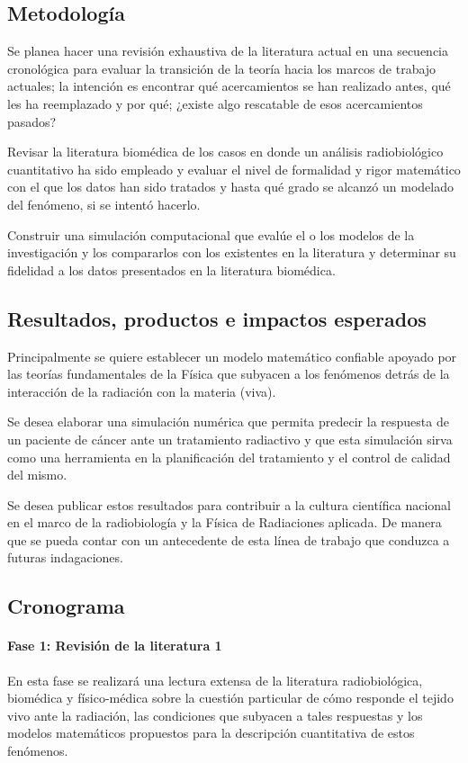 \documentclass[12pt,letterpaper]{article}
\begin{document}
			\subsection*{Metodología}
			Se planea hacer una revisión exhaustiva de la literatura actual en una secuencia cronológica para evaluar la transición de la teoría hacia los marcos de trabajo actuales; la intención es encontrar qué acercamientos se han realizado antes, qué les ha reemplazado y por qué; ¿existe algo rescatable de esos acercamientos pasados?
			
			Revisar la literatura biomédica de los casos en donde un análisis radiobiológico cuantitativo ha sido empleado y evaluar el nivel de formalidad y rigor matemático con el que los datos han sido tratados y hasta qué grado se alcanzó un modelado del fenómeno, si se intentó hacerlo. 
			
			Construir una simulación computacional que evalúe el o los modelos de la investigación y los compararlos con los existentes en la literatura y determinar su fidelidad a los datos presentados en la literatura biomédica. 
			
			\subsection*{Resultados, productos e impactos esperados}
			Principalmente se quiere establecer un modelo matemático confiable apoyado por las teorías fundamentales de la Física que subyacen a los fenómenos detrás de la interacción de la radiación con la materia (viva). 
			
			Se desea elaborar una simulación numérica que permita predecir la respuesta de un paciente de cáncer ante un tratamiento radiactivo y que esta simulación sirva como una herramienta en la planificación del tratamiento y el control de calidad del mismo. 
			
			Se desea publicar estos resultados para contribuir a la cultura científica nacional en el marco de la radiobiología y la Física de Radiaciones aplicada. De manera que se pueda contar con un antecedente de esta línea de trabajo que conduzca a futuras indagaciones. 
			
			\subsection*{Cronograma}
			\paragraph{Fase 1: Revisión de la literatura 1} En esta fase se realizará una lectura extensa de la literatura radiobiológica, biomédica y físico-médica sobre la cuestión particular de cómo responde el tejido vivo ante la radiación, las condiciones que subyacen a tales respuestas y los modelos matemáticos propuestos para la descripción cuantitativa de estos fenómenos.  
\end{document}

